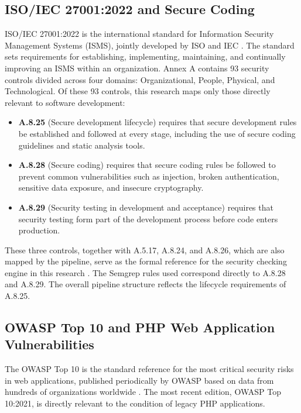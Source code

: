 \subsection{ISO/IEC 27001:2022 and Secure Coding}

ISO/IEC 27001:2022 is the international standard for Information Security Management Systems (ISMS), jointly developed by ISO and IEC \cite{iso27001_2022}. The standard sets requirements for establishing, implementing, maintaining, and continually improving an ISMS within an organization. Annex A contains 93 security controls divided across four domains: Organizational, People, Physical, and Technological. Of these 93 controls, this research maps only those directly relevant to software development:

\begin{itemize}
    \item \textbf{A.8.25} (Secure development lifecycle) requires that secure development rules be established and followed at every stage, including the use of secure coding guidelines and static analysis tools.
    \item \textbf{A.8.28} (Secure coding) requires that secure coding rules be followed to prevent common vulnerabilities such as injection, broken authentication, sensitive data exposure, and insecure cryptography.
    \item \textbf{A.8.29} (Security testing in development and acceptance) requires that security testing form part of the development process before code enters production.
\end{itemize}

These three controls, together with A.5.17, A.8.24, and A.8.26, which are also mapped by the pipeline, serve as the formal reference for the security checking engine in this research \cite{iso27001_2022}. The Semgrep rules used correspond directly to A.8.28 and A.8.29. The overall pipeline structure reflects the lifecycle requirements of A.8.25.

\subsection{OWASP Top 10 and PHP Web Application Vulnerabilities}

The OWASP Top 10 is the standard reference for the most critical security risks in web applications, published periodically by OWASP based on data from hundreds of organizations worldwide \cite{owasp2021}. The most recent edition, OWASP Top 10:2021, is directly relevant to the condition of legacy PHP applications.

